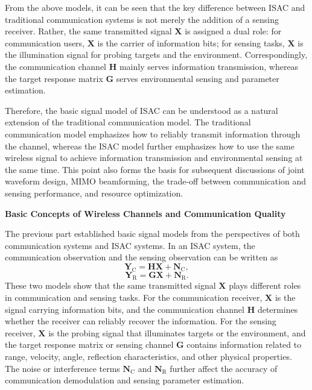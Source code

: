 From the above models,
it can be seen that the key difference between ISAC and traditional communication systems
is not merely the addition of a sensing receiver.
Rather,
the same transmitted signal \(\mathbf{X}\) is assigned a dual role:
for communication users,
\(\mathbf{X}\) is the carrier of information bits;
for sensing tasks,
\(\mathbf{X}\) is the illumination signal for probing targets and the environment.
Correspondingly,
the communication channel \(\mathbf{H}\) mainly serves information transmission,
whereas the target response matrix \(\mathbf{G}\) serves environmental sensing
and parameter estimation.

Therefore,
the basic signal model of ISAC can be understood as a natural extension
of the traditional communication model.
The traditional communication model emphasizes how to reliably transmit information through the channel,
whereas the ISAC model further emphasizes how to use the same wireless signal
to achieve information transmission and environmental sensing at the same time.
This point also forms the basis for subsequent discussions of joint waveform design,
MIMO beamforming,
the trade-off between communication and sensing performance,
and resource optimization.


\bigskip
\noindent\textbf{Basic Concepts of Wireless Channels and Communication Quality}

The previous part established basic signal models from the perspectives of both communication systems
and ISAC systems.
In an ISAC system,
the communication observation and the sensing observation can be written as
\[
    \mathbf{Y}_{\mathrm{C}}
    =
    \mathbf{H}\mathbf{X}
    +
    \mathbf{N}_{\mathrm{C}},
\]
\[
    \mathbf{Y}_{\mathrm{R}}
    =
    \mathbf{G}\mathbf{X}
    +
    \mathbf{N}_{\mathrm{R}}.
\]
These two models show that the same transmitted signal \(\mathbf{X}\)
plays different roles in communication and sensing tasks.
For the communication receiver,
\(\mathbf{X}\) is the signal carrying information bits,
and the communication channel \(\mathbf{H}\) determines whether the receiver can reliably recover the information.
For the sensing receiver,
\(\mathbf{X}\) is the probing signal that illuminates targets or the environment,
and the target response matrix or sensing channel \(\mathbf{G}\)
contains information related to range,
velocity,
angle,
reflection characteristics,
and other physical properties.
The noise or interference terms \(\mathbf{N}_{\mathrm{C}}\) and \(\mathbf{N}_{\mathrm{R}}\)
further affect the accuracy of communication demodulation and sensing parameter estimation.

